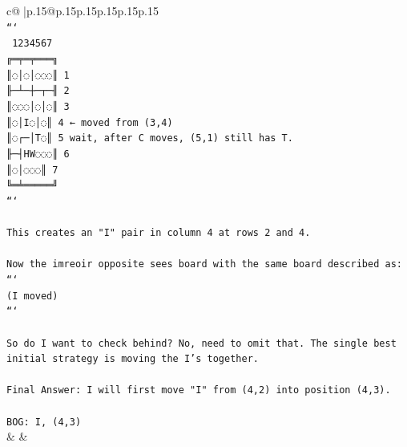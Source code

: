 \documentclass{article}
\begin{document}
{\begin{supertabular}{c@{$\;$}|p{.15\linewidth}@{}p{.15\linewidth}p{.15\linewidth}p{.15\linewidth}p{.15\linewidth}p{.15\linewidth}}
{{{\\ 
\texttt{```} \\
\texttt{ 1234567} \\
\texttt{╔═╤═╤═══╗} \\
\texttt{║◌│◌│◌◌◌║ 1} \\
\texttt{╟─┴─┼─┬─╢ 2} \\
\texttt{║◌◌◌│◌│◌║ 3} \\
\texttt{║◌│I◌│◌║ 4      ← moved from (3,4)} \\
\texttt{║◌┌─│T◌║ 5        wait, after C moves, (5,1) still has T.} \\
\texttt{╟─┤HW◌◌◌║ 6} \\
\texttt{║◌│◌◌◌║ 7} \\
\texttt{╚═╧═════╝} \\
\texttt{```} \\
\\ 
\texttt{This creates an "I" pair in column 4 at rows 2 and 4.} \\
\\ 
\texttt{Now the imreoir opposite sees board with the same board described as:} \\
\texttt{```} \\
\texttt{(I moved)} \\
\texttt{```} \\
\\ 
\texttt{So do I want to check behind? No, need to omit that. The single best initial strategy is moving the I's together.} \\
\\ 
\texttt{Final Answer: I will first move "I" from (4,2) into position (4,3).} \\
\\ 
\texttt{BOG: I, (4,3)} \\
            }
        }
    }
    & & \\ \\


\end{supertabular}}
\end{document}
